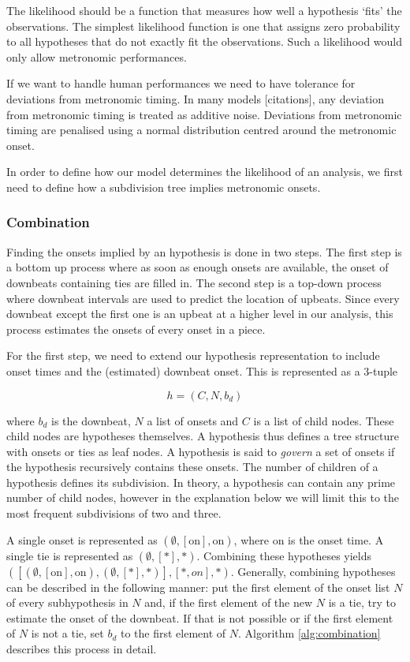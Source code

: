 The likelihood should be a function that measures how well a hypothesis `fits' the observations. The simplest likelihood function is one that assigns zero probability to all hypotheses that do not exactly fit the observations. Such a likelihood would only allow metronomic performances. 

If we want to handle human performances we need to have tolerance for deviations from metronomic timing. In many models [citations], any deviation from metronomic timing is treated as additive noise. Deviations from metronomic timing are penalised using a normal distribution centred around the metronomic onset.

In order to define how our model determines the likelihood of an analysis, we first need to define how a subdivision tree implies metronomic onsets. 


\subsubsection{Combination}

Finding the onsets implied by an hypothesis is done in two steps. The first step is a bottom up process where as soon as enough onsets are available, the onset of downbeats containing ties are filled in. The second step is a top-down process where downbeat intervals are used to predict the location of upbeats. Since every downbeat except the first one is an upbeat at a higher level in our analysis, this process estimates the onsets of every onset in a piece.

For the first step, we need to extend our hypothesis representation to include onset times and the (estimated) downbeat onset. This is represented as a 3-tuple

\begin{equation}
h = (C, N, b_d)
\end{equation}

where $b_d$ is the downbeat, $N$ a list of onsets and $C$ is a list of child nodes. These child nodes are hypotheses themselves. A hypothesis thus defines a tree structure with onsets or ties as leaf nodes. A hypothesis is said to \textit{govern} a set of onsets if the hypothesis recursively contains these onsets. The number of children of a hypothesis defines its subdivision. In theory, a hypothesis can contain any prime number of child nodes, however in the explanation below we will limit this to the most frequent subdivisions of two and three.

A single onset is represented as $(\emptyset, [\textrm{on}], \textrm{on})$, where on is the onset time. A single tie is represented as $(\emptyset, [*], *)$.  Combining these hypotheses yields $([(\emptyset, [\textrm{on}], \textrm{on}), (\emptyset, [*], *)], [*, on], *)$. Generally, combining hypotheses can be described in the following manner: put the first element of the onset list $N$ of every subhypothesis in $N$ and, if the first element of the new $N$ is a tie, try to estimate the onset of the downbeat. If that is not possible or if the first element of $N$ is not a tie, set $b_d$ to the first element of $N$. Algorithm \ref{alg:combination} describes this process in detail.


